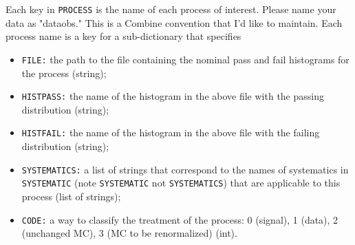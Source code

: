 \documentclass[letter]{article}
\begin{document}
            Each key in \verb"PROCESS" is the name of each process of interest. Please name your data as "data\textunderscore obs." This is a Combine convention that I'd like to maintain. Each process name is a key for a sub-dictionary that specifies
            \begin{itemize}
                \item \verb"FILE:" the path to the file containing the nominal pass and fail histograms for the process (string);
                \item \verb"HISTPASS:" the name of the histogram in the above file with the passing distribution (string);
                \item \verb"HISTFAIL:" the name of the histogram in the above file with the failing distribution (string);
                \item \verb"SYSTEMATICS:" a list of strings that correspond to the names of systematics in \verb"SYSTEMATIC" (note \verb"SYSTEMATIC" not \verb"SYSTEMATICS") that are applicable to this process (list of strings);
                \item \verb"CODE:" a way to classify the treatment of the process: 0 (signal), 1 (data), 2 (unchanged MC), 3 (MC to be renormalized) (int).
            \end{itemize} 
\end{document}
